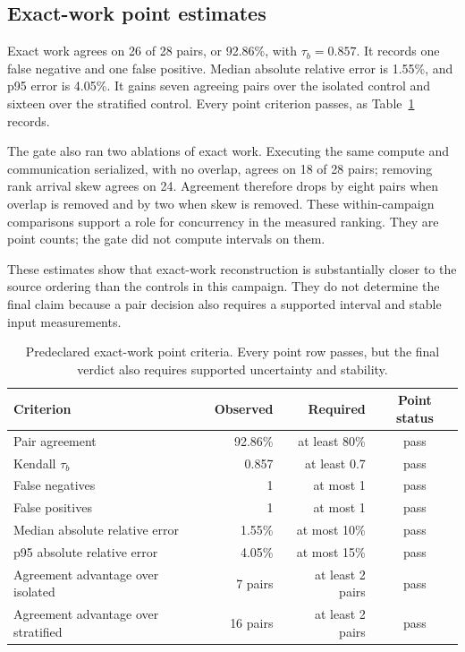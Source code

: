 \documentclass[10pt,twocolumn]{article}
\begin{document}
\subsection{Exact-work point estimates}

Exact work agrees on 26 of 28 pairs, or 92.86\%, with $\tau_b=0.857$. It
records one false negative and one false positive. Median absolute relative
error is 1.55\%, and p95 error is 4.05\%. It gains seven agreeing pairs over
the isolated control and sixteen over the stratified control. Every point
criterion passes, as Table~\ref{tab:criteria} records.

The gate also ran two ablations of exact work. Executing the same
compute and communication serialized, with no overlap, agrees on 18 of 28
pairs; removing rank arrival skew agrees on 24. Agreement therefore drops by
eight pairs when overlap is removed and by two when skew is removed. These
within-campaign comparisons support a role for concurrency in the measured
ranking. They are point counts; the gate did not compute intervals on them.

These estimates show that exact-work reconstruction is substantially closer to
the source ordering than the controls in this campaign. They do not determine
the final claim because a pair decision also requires a supported interval and
stable input measurements.

\begin{table}[t]
\caption{Predeclared exact-work point criteria. Every point row passes, but the
final verdict also requires supported uncertainty and stability.}
\label{tab:criteria}
\centering\small
\begin{tabular}{@{}lrrc@{}}
\toprule
Criterion & Observed & Required & Point status \\
\midrule
Pair agreement & 92.86\% & at least 80\% & pass \\
Kendall $\tau_b$ & 0.857 & at least 0.7 & pass \\
False negatives & 1 & at most 1 & pass \\
False positives & 1 & at most 1 & pass \\
Median absolute relative error & 1.55\% & at most 10\% & pass \\
p95 absolute relative error & 4.05\% & at most 15\% & pass \\
Agreement advantage over isolated & 7 pairs & at least 2 pairs & pass \\
Agreement advantage over stratified & 16 pairs & at least 2 pairs & pass \\
\bottomrule
\end{tabular}
\end{table}
\end{document}

